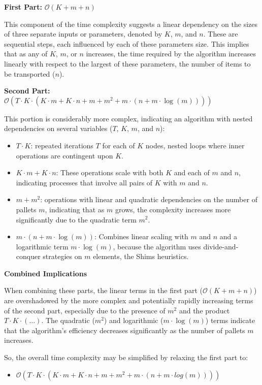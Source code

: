 \documentclass[preprint,authoryear]{elsarticle}
\begin{document}
{\textbf{First Part:} $\mathcal{O}(K+m+n)$

This component of the time complexity suggests a linear dependency on the sizes of three separate inputs or parameters, denoted by $K$, $m$, and $n$.
These are sequential steps, each influenced by each of these parameters size. This implies that as any of $K$, $m$, or $n$ increases, the time required by the algorithm increases linearly with respect to the largest of these parameters, the number of items to be transported ($n$).

\textbf{Second Part:} $\mathcal{O}(T \cdot K \cdot (K \cdot m + K \cdot n + m + m^2 + m \cdot (n + m \cdot \log(m))))$

This portion is considerably more complex, indicating an algorithm with nested dependencies on several variables ($T$, $K$, $m$, and $n$):

\begin{itemize}
	\item $T \cdot K$: repeated iterations $T$ for each of $K$ nodes, nested loops where inner operations are contingent upon $K$.
	\item $K \cdot m + K \cdot n$: These operations scale with both $K$ and each of $m$ and $n$, indicating processes that involve all pairs of $K$ with $m$ and $n$.
	\item $m + m^2$: operations with linear and quadratic dependencies on the number of pallets $m$, indicating that as $m$ grows, the complexity increases more significantly due to the quadratic term $m^2$.
	\item $m \cdot (n + m \cdot \log(m))$: Combines linear scaling with $m$ and $n$ and a logarithmic term $m \cdot \log(m)$, because the algorithm uses divide-and-conquer strategies on $m$ elements, the Shims heuristics.
\end{itemize}

\textbf{Combined Implications}

When combining these parts, the linear terms in the first part ($\mathcal{O}(K+m+n)$) are overshadowed by the more complex and potentially rapidly increasing terms of the second part, especially due to the presence of $m^2$ and the product $T \cdot K \cdot (...)$. The quadratic ($m^2$) and logarithmic ($m \cdot \log(m)$) terms indicate that the algorithm's efficiency decreases significantly as the number of pallets $m$ increases.

So, the overall time complexity may be simplified by relaxing the first part to:
\begin{itemize}
	\item $\mathcal{O}(T \cdot K \cdot (K \cdot m + K \cdot n + m + m^2 + m \cdot (n + m \cdot log(m))))$
\end{itemize}

}
\end{document}
